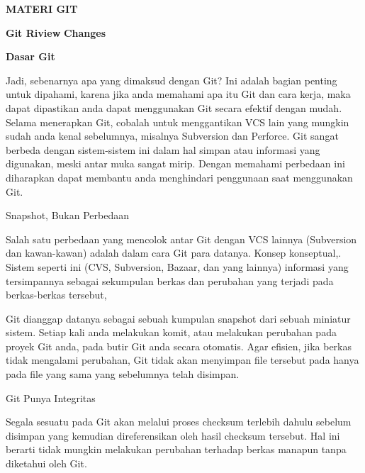 
\sloppy
\begin{center}{\fontsize{16pt}{16pt}\selectfont \textbf{MATERI GIT} \\}\end{center} \par
\noindent 
\begin{center}{\fontsize{14pt}{14pt}\selectfont \textbf{Git Riview}\textbf{ Changes} \\}\end{center} \par
\noindent 
{\fontsize{14pt}{14pt}\selectfont \textbf{Dasar Git} \\} \par
\noindent 
 \hspace*{0.5in} Jadi, sebenarnya apa yang dimaksud dengan Git? Ini adalah bagian penting untuk dipahami, karena jika anda memahami apa itu Git dan cara kerja, maka dapat dipastikan anda dapat menggunakan Git secara efektif dengan mudah. Selama menerapkan Git, cobalah untuk menggantikan VCS lain yang mungkin sudah anda kenal sebelumnya, misalnya Subversion dan Perforce. Git sangat berbeda dengan sistem-sistem ini dalam hal simpan atau informasi yang digunakan, meski antar muka sangat mirip. Dengan memahami perbedaan ini diharapkan dapat membantu anda menghindari penggunaan saat menggunakan Git. \par
\noindent 
Snapshot, Bukan Perbedaan \par
\noindent 
 \hspace*{0.5in} Salah satu perbedaan yang mencolok antar Git dengan VCS lainnya (Subversion dan kawan-kawan) adalah dalam cara Git para datanya. Konsep konseptual,. Sistem seperti ini (CVS, Subversion, Bazaar, dan yang lainnya) informasi yang tersimpannya sebagai sekumpulan berkas dan perubahan yang terjadi pada berkas-berkas tersebut, \par
\noindent 
Git dianggap datanya sebagai sebuah kumpulan snapshot dari sebuah miniatur sistem. Setiap kali anda melakukan komit, atau melakukan perubahan pada proyek Git anda, pada butir Git anda secara otomatis. Agar efisien, jika berkas tidak mengalami perubahan, Git tidak akan menyimpan file tersebut pada hanya pada file yang sama yang sebelumnya telah disimpan. \par
\noindent 
Git Punya Integritas \par
\noindent 
Segala sesuatu pada Git akan melalui proses checksum terlebih dahulu sebelum disimpan yang kemudian direferensikan oleh hasil checksum tersebut. Hal ini berarti tidak mungkin melakukan perubahan terhadap berkas manapun tanpa diketahui oleh Git.  \par
